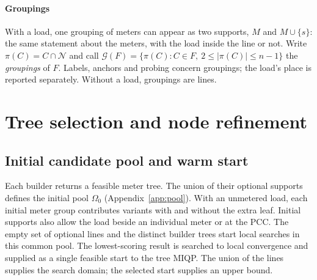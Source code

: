 \documentclass[journal,onecolumn,11pt]{IEEEtran}
\newcommand{\Nset}{\mathcal{N}}
\newcommand{\Gset}{\mathcal{G}}
\begin{document}
\paragraph*{Groupings} With a load, one grouping of meters can appear as two supports, $M$ and $M\cup\{s\}$: the same
statement about the meters, with the load inside the line or not. Write $\pi(C)=C\cap\Nset$ and call
$\Gset(F)=\{\pi(C):C\in F,\ 2\le|\pi(C)|\le n-1\}$ the \emph{groupings} of $F$. Labels, anchors and probing concern
groupings; the load's place is reported separately. Without a load, groupings are lines.

\section{Tree selection and node refinement}\label{sec:id}

\subsection{Initial candidate pool and warm start}
Each builder returns a feasible meter tree. The union of their optional supports defines the initial pool
$\Omega_0$ (Appendix~\ref{app:pool}). With an unmetered load, each initial meter group contributes variants with and
without the extra leaf. Initial supports also allow the load beside an individual meter or at the PCC.
The empty set of optional lines and the distinct builder trees start local searches in this common pool.
The lowest-scoring result is searched to local convergence and supplied as a single feasible start to the tree MIQP.
The union of the lines supplies the search domain; the selected start supplies an upper bound.
\end{document}
